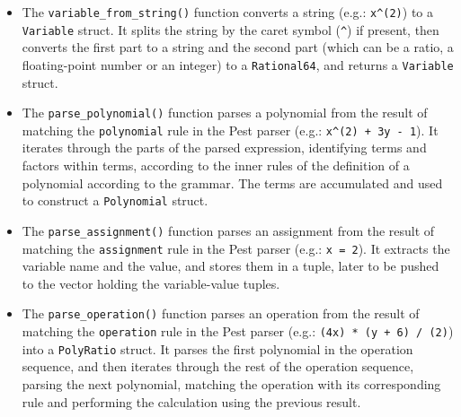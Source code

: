 \begin{itemize}
    \item The \verb|variable_from_string()| function converts a string (e.g.: \verb|x^(2)|) to a \verb|Variable| struct. It splits the string by the caret symbol (\verb|^|) if present, then converts the first part to a string and the second part (which can be a ratio, a floating-point number or an integer) to a \verb|Rational64|, and returns a \verb|Variable| struct.
    \item The \verb|parse_polynomial()| function parses a polynomial from the result of matching the \verb|polynomial| rule in the Pest parser (e.g.: \verb|x^(2) + 3y - 1|). It iterates through the parts of the parsed expression, identifying terms and factors within terms, according to the inner rules of the definition of a polynomial according to the grammar. The terms are accumulated and used to construct a \verb|Polynomial| struct.
    \item The \verb|parse_assignment()| function parses an assignment from the result of matching the \verb|assignment| rule in the Pest parser (e.g.: \verb|x = 2|). It extracts the variable name and the value, and stores them in a tuple, later to be pushed to the vector holding the variable-value tuples.
    \item The \verb|parse_operation()| function parses an operation from the result of matching the \verb|operation| rule in the Pest parser (e.g.: \verb|(4x) * (y + 6) / (2)|) into a \verb|PolyRatio| struct. It parses the first polynomial in the operation sequence, and then iterates through the rest of the operation sequence, parsing the next polynomial, matching the operation with its corresponding rule and performing the calculation using the previous result.
\end{itemize}

